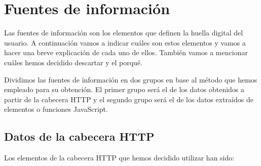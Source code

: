\chapter{Fuentes de información}
\label{ch:fuentes_info}
Las fuentes de información son los elementos que definen la huella digital del usuario. A continuación vamos a indicar cuáles son estos elementos y vamos a hacer una breve explicación de cada uno de ellos. También vamos a mencionar cuáles hemos decidido descartar y el porqué.\par
Dividimos las fuentes de información en dos grupos en base al método que hemos empleado para su obtención. El primer grupo será el de los datos obtenidos a partir de la cabecera HTTP y el segundo grupo será el de los datos extraídos de elementos o funciones JavaScript.
\section{Datos de la cabecera HTTP}
\noindent Los elementos de la cabecera HTTP que hemos decidido utilizar han sido:
